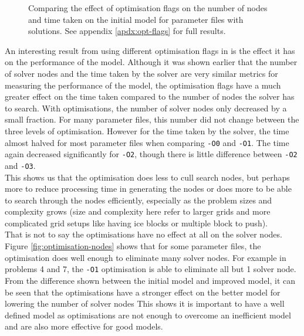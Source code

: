 \documentclass{article}
\newcommand{\n}[0]{\\[\baselineskip]}
\begin{document}
\begin{figure}[H]
\begin{minipage}{0.45\textwidth}
\end{minipage}
\caption{Comparing the effect of optimisation flags on the number of nodes and time taken on the initial model for parameter files with solutions. See appendix \ref{apdx:opt-flags} for full results.}
\end{figure}
\noindent
An interesting result from using different optimisation flags in is the effect it has on the performance of the model. Although it was shown earlier that the number of solver nodes and the time taken by the solver are very similar metrics for measuring the performance of the model, the optimisation flags have a much greater effect on the time taken compared to the number of nodes the solver has to search. With optimisations, the number of solver nodes only decreased by a small fraction. For many parameter files, this number did not change between the three levels of optimisation. However for the time taken by the solver, the time almost halved for most parameter files when comparing \texttt{-O0} and \texttt{-O1}. The time again decreased significantly for \texttt{-O2}, though there is little difference between \texttt{-O2} and \texttt{-O3}.
\n
This shows us that the optimisation does less to cull search nodes, but perhaps more to reduce processing time in generating the nodes or does more to be able to search through the nodes efficiently, especially as the problem sizes and complexity grows (size and complexity here refer to larger grids and more complicated grid setups like having ice blocks or multiple block to push). 
\n
That is not to say the optimisations have no effect at all on the solver nodes. Figure \ref{fig:optimisation-nodes} shows that for some parameter files, the optimisation does well enough to eliminate many solver nodes. For example in problems 4 and 7, the \texttt{-O1} optimisation is able to eliminate all but 1 solver node. From the difference shown between the initial model and improved model, it can be seen that the optimisations have a stronger effect on the better model for lowering the number of solver nodes This shows it is important to have a well defined model as optimisations are not enough to overcome an inefficient model and are also more effective for good models. 
\end{document}
